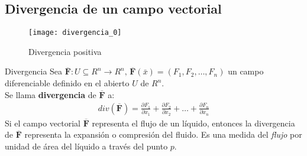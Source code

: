 \documentclass[a4paper, twoside]{article}
\numberwithin{equation}{section}
\numberwithin{figure}{section}
\numberwithin{table}{section}
\newcommand{\vect}[1]{\overline{\textbf{#1}}}
\begin{document}
\subsection{Divergencia de un campo vectorial}
\begin{minipage}{0.28\textwidth}
	\begin{figure}[H]
		\centering
		\texttt{[image: divergencia\_0]}
		\caption{Divergencia positiva}
	\end{figure}
\end{minipage}
\begin{minipage}{0.7\textwidth}
	\begin{definicion*}{Divergencia}
		Sea $\vect{F}:U \subseteq R^n \to R^n,\,\vect{F}\left(\bar{x}\right)=(F_1,F_2,\ldots,F_n)$ un campo diferenciable definido en el abierto $U$ de $R^n$.\\
		
		Se llama \textbf{divergencia} de $\vect{F}$ a:
		\begin{align}
			div(\vect{F}) = \frac{\partial F_1}{\partial x_1} + \frac{\partial F_2}{\partial x_2} + \ldots + \frac{\partial F_n}{\partial x_n}
		\end{align}
		Si el campo vectorial $\vect{F}$ representa el flujo de un líquido, entonces la divergencia de $\vect{F}$ representa la expansión o compresión del fluido. Es una medida del \emph{flujo} por unidad de área del líquido a través del punto $p$.
	\end{definicion*}
\end{minipage}
\end{document}
